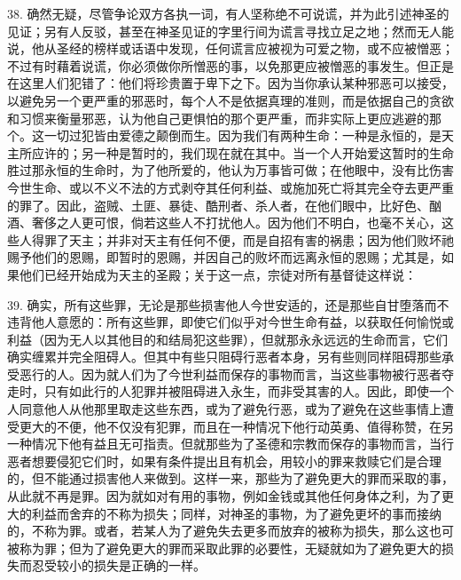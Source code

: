 38. 确然无疑，尽管争论双方各执一词，有人坚称绝不可说谎，并为此引述神圣的见证；另有人反驳，甚至在神圣见证的字里行间为谎言寻找立足之地；然而无人能说，他从圣经的榜样或话语中发现，任何谎言应被视为可爱之物，或不应被憎恶；不过有时藉着说谎，你必须做你所憎恶的事，以免那更应被憎恶的事发生。但正是在这里人们犯错了：他们将珍贵置于卑下之下。因为当你承认某种邪恶可以接受，以避免另一个更严重的邪恶时，每个人不是依据真理的准则，而是依据自己的贪欲和习惯来衡量邪恶，认为他自己更惧怕的那个更严重，而非实际上更应逃避的那个。这一切过犯皆由爱德之颠倒而生。因为我们有两种生命：一种是永恒的，是天主所应许的；另一种是暂时的，我们现在就在其中。当一个人开始爱这暂时的生命胜过那永恒的生命时，为了他所爱的，他认为万事皆可做；在他眼中，没有比伤害今世生命、或以不义不法的方式剥夺其任何利益、或施加死亡将其完全夺去更严重的罪了。因此，盗贼、土匪、暴徒、酷刑者、杀人者，在他们眼中，比好色、酗酒、奢侈之人更可恨，倘若这些人不打扰他人。因为他们不明白，也毫不关心，这些人得罪了天主；并非对天主有任何不便，而是自招有害的祸患；因为他们败坏祂赐予他们的恩赐，即暂时的恩赐，并因自己的败坏而远离永恒的恩赐；尤其是，如果他们已经开始成为天主的圣殿；关于这一点，宗徒对所有基督徒这样说：\par

39. 确实，所有这些罪，无论是那些损害他人今世安适的，还是那些自甘堕落而不违背他人意愿的：所有这些罪，即使它们似乎对今世生命有益，以获取任何愉悦或利益（因为无人以其他目的和结局犯这些罪），但就那永永远远的生命而言，它们确实缠累并完全阻碍人。但其中有些只阻碍行恶者本身，另有些则同样阻碍那些承受恶行的人。因为就人们为了今世利益而保存的事物而言，当这些事物被行恶者夺走时，只有如此行的人犯罪并被阻碍进入永生，而非受其害的人。因此，即使一个人同意他人从他那里取走这些东西，或为了避免行恶，或为了避免在这些事情上遭受更大的不便，他不仅没有犯罪，而且在一种情况下他行动英勇、值得称赞，在另一种情况下他有益且无可指责。但就那些为了圣德和宗教而保存的事物而言，当行恶者想要侵犯它们时，如果有条件提出且有机会，用较小的罪来救赎它们是合理的，但不能通过损害他人来做到。这样一来，那些为了避免更大的罪而采取的事，从此就不再是罪。因为就如对有用的事物，例如金钱或其他任何身体之利，为了更大的利益而舍弃的不称为损失；同样，对神圣的事物，为了避免更坏的事而接纳的，不称为罪。或者，若某人为了避免失去更多而放弃的被称为损失，那么这也可被称为罪；但为了避免更大的罪而采取此罪的必要性，无疑就如为了避免更大的损失而忍受较小的损失是正确的一样。\par

